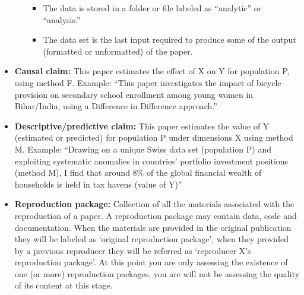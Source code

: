 \documentclass[]{book}
\providecommand{\tightlist}{%
  \setlength{\itemsep}{0pt}\setlength{\parskip}{0pt}}
\begin{document}
\begin{itemize}
\begin{itemize}
    \begin{itemize}
    \tightlist
    \item
      The data is stored in a folder or file labeled as ``analytic'' or ``analysis.''
    \item
      The data set is the last input required to produce some of the output (formatted or unformatted) of the paper.
    \end{itemize}
  \end{itemize}
\item
  \textbf{Causal claim:} This paper estimates the effect of X on Y for population P, using method F. Example: ``This paper investigates the impact of bicycle provision on secondary school enrollment among young women in Bihar/India, using a Difference in Difference approach.''
\item
  \textbf{Descriptive/predictive claim:} This paper estimates the value of Y (estimated or predicted) for population P under dimensions X using method M. Example: ``Drawing on a unique Swiss data set (population P) and exploiting systematic anomalies in countries' portfolio investment positions (method M), I find that around 8\% of the global financial wealth of households is held in tax havens (value of Y)''
\item
  \textbf{Reproduction package:} Collection of all the materials associated with the reproduction of a paper. A reproduction package may contain data, code and documentation. When the materials are provided in the original publication they will be labeled as `original reproduction package', when they provided by a previous reproducer they will be referred as `reproducer X's reproduction package'. At this point you are only assessing the existence of one (or more) reproduction packages, you are will not be assessing the quality of its content at this stage.
\end{itemize}


\end{document}
